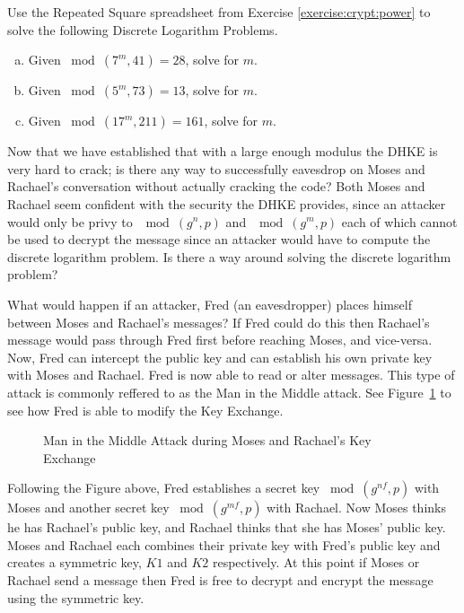 \begin{exer}
Use the Repeated Square spreadsheet from Exercise \ref{exercise:crypt:power} to solve the following Discrete Logarithm Problems.  
\begin{enumerate}[(a)]
\item Given $ \bmod(7^{m}, 41)=28$, solve for $m$.

\item Given $ \bmod(5^{m}, 73)=13$, solve for $m$.

\item Given $ \bmod(17^{m}, 211)=161$, solve for $m$.
\end{enumerate}
\end{exer}
Now that we have established that with a large enough modulus the DHKE is very hard to crack; is there any way to successfully eavesdrop on Moses and Rachael's conversation without actually cracking the code?  Both Moses and Rachael seem confident with the security the DHKE provides, since an attacker would only be privy to $\mod (g^n , p)$ and $\mod (g^m , p)$ each of which cannot be used to decrypt the message since an attacker would have to compute the discrete logarithm problem. Is there a way around solving the discrete logarithm problem?  

What would happen if an attacker, Fred (an eavesdropper) places himself between Moses and Rachael's messages?  If Fred could do this then Rachael's message would pass through Fred first before reaching Moses, and vice-versa. Now, Fred can intercept the public key and can establish his own private key with Moses and Rachael.  Fred is now able to read or alter messages.  This type of attack is commonly reffered to as the Man in the Middle attack.  See Figure~\ref{fig:DH:DHKE_2} to see how Fred is able to modify the Key Exchange.
\begin{figure}[H]
	  \caption{\label{fig:DH:DHKE_2} Man in the Middle Attack during Moses and Rachael's Key Exchange }
\end{figure}

Following the Figure above, Fred establishes a secret key $\bmod ( g^{nf}, p)$ with Moses and another secret key $\bmod ( g^{mf}, p)$ with Rachael.  Now Moses thinks he has Rachael's public key, and Rachael thinks that she has Moses' public key. Moses and Rachael each combines their private key with Fred's public key and creates a symmetric key, $K1$ and $K2$ respectively. At this point if Moses or Rachael send a message then Fred is free to decrypt and encrypt the message using the symmetric key. 

